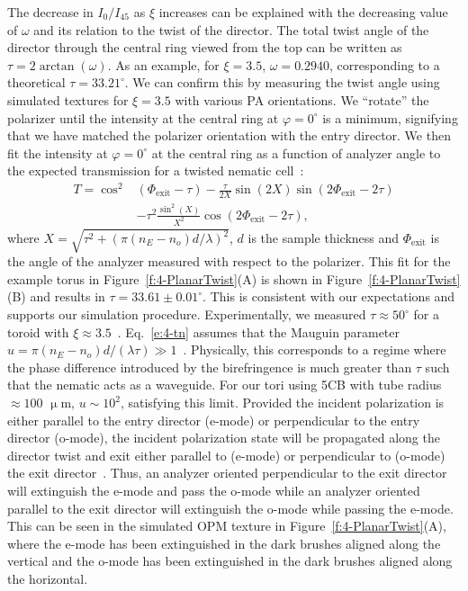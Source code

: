 The decrease in $I_0/I_{45}$ as $\xi$ increases can be explained with the decreasing value of $\omega$ and its relation to the twist of the director.
The total twist angle of the director through the central ring viewed from the top can be written as $\tau = 2 \arctan (\omega)$.
As an example, for $\xi = 3.5$, $\omega = 0.2940$, corresponding to a theoretical $\tau = 33.21^{\circ}$.
We can confirm this by measuring the twist angle using simulated textures for $\xi=3.5$ with various PA orientations.
We ``rotate'' the polarizer until the intensity at the central ring at $\varphi=0^{\circ}$ is a minimum, signifying that we have matched the polarizer orientation with the entry director.
We then fit the intensity at $\varphi=0^{\circ}$ at the central ring as a function of analyzer angle to the expected transmission for a twisted nematic cell~\cite{RN232}:
\begin{align}\label{e:4-tn}
T = \cos ^2&(\Phi_{\textrm{exit}}-\tau)-\frac{\tau}{2 X}\sin(2X)\sin(2\Phi_{\textrm{exit}}-2\tau)\nonumber \\
&-\tau ^2\frac{\sin ^2 (X)}{X^2}\cos(2\Phi_{\textrm{exit}}-2\tau),
\end{align}
where $X = \sqrt{\tau^2+(\pi(n_E-n_o)d/\lambda)^2}$, $d$ is the sample thickness and $\Phi_\textrm{exit}$ is the angle of the analyzer measured with respect to the polarizer.
This fit for the example torus in Figure~\ref{f:4-PlanarTwist}(A) is shown in Figure~\ref{f:4-PlanarTwist}(B) and results in $\tau=33.61 \pm 0.01^{\circ}$.
This is consistent with our expectations and supports our simulation procedure.
Experimentally, we measured $\tau \approx 50^{\circ}$ for a toroid with $\xi \approx 3.5$~\cite{RN24}. Eq.~\ref{e:4-tn} assumes that the Mauguin parameter $u =  \pi (n_E-n_o) d /(\lambda \tau) \gg 1$~\cite{RN232}.
 Physically, this corresponds to a regime where the phase difference introduced by the birefringence is much greater than $\tau$ such that the nematic acts as a waveguide.
For our tori using 5CB with tube radius $\approx 100$ $\upmu$m, $u\sim 10^{2}$, satisfying this limit.
Provided the incident polarization is either parallel to the entry director (e-mode) or perpendicular to the entry director (o-mode), the incident polarization state will be propagated along the director twist and exit either parallel to (e-mode) or perpendicular to (o-mode) the exit director~\cite{RN232}.
Thus, an analyzer oriented perpendicular to the exit director will extinguish the e-mode and pass the o-mode while an analyzer oriented parallel to the exit director will extinguish the o-mode while passing the e-mode.
This can be seen in the simulated OPM texture in Figure~\ref{f:4-PlanarTwist}(A), where the e-mode has been extinguished in the dark brushes aligned along the vertical and the o-mode has been extinguished in the dark brushes aligned along the horizontal.


